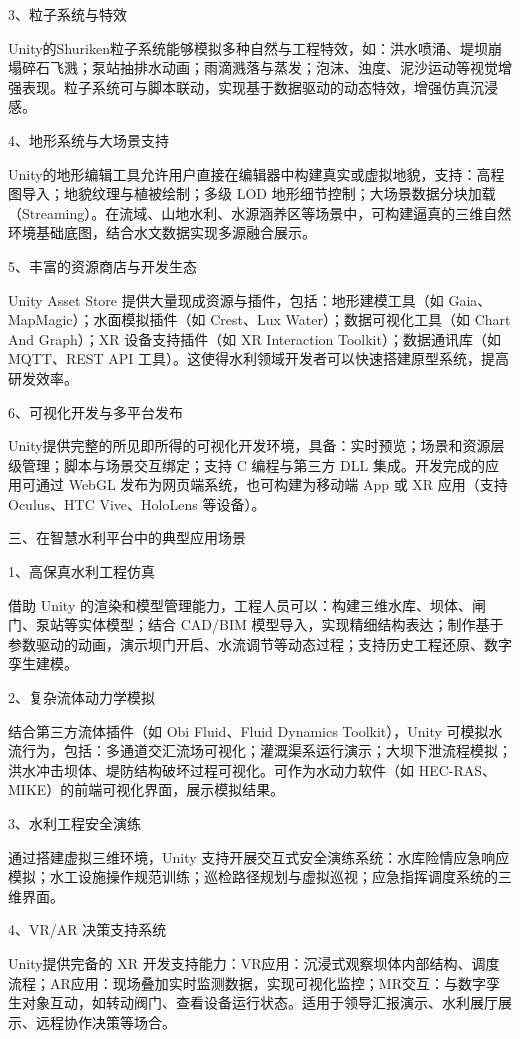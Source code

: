 3、粒子系统与特效

Unity的Shuriken粒子系统能够模拟多种自然与工程特效，如：洪水喷涌、堤坝崩塌碎石飞溅；泵站抽排水动画；雨滴溅落与蒸发；泡沫、浊度、泥沙运动等视觉增强表现。粒子系统可与脚本联动，实现基于数据驱动的动态特效，增强仿真沉浸感。

4、地形系统与大场景支持

Unity的地形编辑工具允许用户直接在编辑器中构建真实或虚拟地貌，支持：高程图导入；地貌纹理与植被绘制；多级 LOD 地形细节控制；大场景数据分块加载（Streaming）。在流域、山地水利、水源涵养区等场景中，可构建逼真的三维自然环境基础底图，结合水文数据实现多源融合展示。

5、丰富的资源商店与开发生态

Unity Asset Store 提供大量现成资源与插件，包括：地形建模工具（如 Gaia、MapMagic）；水面模拟插件（如 Crest、Lux Water）；数据可视化工具（如 Chart And Graph）；XR 设备支持插件（如 XR Interaction Toolkit）；数据通讯库（如 MQTT、REST API 工具）。这使得水利领域开发者可以快速搭建原型系统，提高研发效率。

6、可视化开发与多平台发布

Unity提供完整的所见即所得的可视化开发环境，具备：实时预览；场景和资源层级管理；脚本与场景交互绑定；支持 C 编程与第三方 DLL 集成。开发完成的应用可通过 WebGL 发布为网页端系统，也可构建为移动端 App 或 XR 应用（支持 Oculus、HTC Vive、HoloLens 等设备）。

三、在智慧水利平台中的典型应用场景

1、高保真水利工程仿真

借助 Unity 的渲染和模型管理能力，工程人员可以：构建三维水库、坝体、闸门、泵站等实体模型；结合 CAD/BIM 模型导入，实现精细结构表达；制作基于参数驱动的动画，演示坝门开启、水流调节等动态过程；支持历史工程还原、数字孪生建模。

2、复杂流体动力学模拟

结合第三方流体插件（如 Obi Fluid、Fluid Dynamics Toolkit），Unity 可模拟水流行为，包括：多通道交汇流场可视化；灌溉渠系运行演示；大坝下泄流程模拟；洪水冲击坝体、堤防结构破坏过程可视化。可作为水动力软件（如 HEC-RAS、MIKE）的前端可视化界面，展示模拟结果。

3、水利工程安全演练

通过搭建虚拟三维环境，Unity 支持开展交互式安全演练系统：水库险情应急响应模拟；水工设施操作规范训练；巡检路径规划与虚拟巡视；应急指挥调度系统的三维界面。

4、VR/AR 决策支持系统

Unity提供完备的 XR 开发支持能力：VR应用：沉浸式观察坝体内部结构、调度流程；AR应用：现场叠加实时监测数据，实现可视化监控；MR交互：与数字孪生对象互动，如转动阀门、查看设备运行状态。适用于领导汇报演示、水利展厅展示、远程协作决策等场合。

